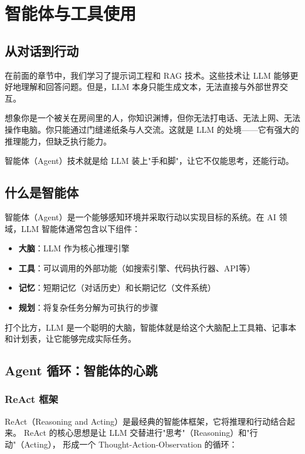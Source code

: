 \chapter{智能体与工具使用}

\section{从对话到行动}

在前面的章节中，我们学习了提示词工程和 RAG 技术。这些技术让 LLM 能够更好地理解和回答问题。但是，LLM 本身只能生成文本，无法直接与外部世界交互。

想象你是一个被关在房间里的人，你知识渊博，但你无法打电话、无法上网、无法操作电脑。你只能通过门缝递纸条与人交流。这就是 LLM 的处境——它有强大的推理能力，但缺乏执行能力。

智能体（Agent）技术就是给 LLM 装上"手和脚"，让它不仅能思考，还能行动。

\section{什么是智能体}

智能体（Agent）是一个能够感知环境并采取行动以实现目标的系统。在 AI 领域，LLM 智能体通常包含以下组件：

\begin{itemize}
    \item \textbf{大脑}：LLM 作为核心推理引擎
    \item \textbf{工具}：可以调用的外部功能（如搜索引擎、代码执行器、API等）
    \item \textbf{记忆}：短期记忆（对话历史）和长期记忆（文件系统）
    \item \textbf{规划}：将复杂任务分解为可执行的步骤
\end{itemize}

打个比方，LLM 是一个聪明的大脑，智能体就是给这个大脑配上工具箱、记事本和计划表，让它能够完成实际任务。

\section{Agent 循环：智能体的心跳}

\subsection{ReAct 框架}

ReAct（Reasoning and Acting）是最经典的智能体框架，它将推理和行动结合起来。
ReAct 的核心思想是让 LLM 交替进行"思考"（Reasoning）和"行动"（Acting），
形成一个 Thought-Action-Observation 的循环：

